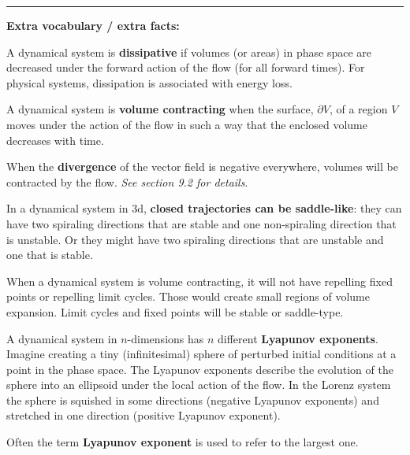 \documentclass[12pt,letterpaper,noanswers]{exam}
\begin{document}
\vspace{0.2cm}
\hrule
\vspace{0.2cm}

\noindent \textbf{Extra vocabulary / extra facts:}
\begin{tcolorbox}

A dynamical system is \textbf{dissipative} if volumes (or areas) in phase space are decreased under the forward action of the flow (for all forward times).  For physical systems, dissipation is associated with energy loss.

A dynamical system is \textbf{volume contracting} when the surface, $\partial V$, of a region $V$ moves under the action of the flow in such a way that the enclosed volume decreases with time. %

When the \textbf{divergence} of the vector field is negative everywhere, volumes will be contracted by the flow.  \emph{See section 9.2 for details}.

In a dynamical system in 3d, \textbf{closed trajectories can be saddle-like}: they can have two spiraling directions that are stable and one non-spiraling direction that is unstable.  Or they might have two spiraling directions that are unstable and one that is stable.
\end{tcolorbox}

\begin{tcolorbox}
When a dynamical system is volume contracting, it will not have repelling fixed points or repelling limit cycles.  Those would create small regions of volume expansion.  Limit cycles and fixed points will be stable or saddle-type.

A dynamical system in $n$-dimensions has $n$ different \textbf{Lyapunov exponents}. Imagine creating a tiny (infinitesimal) sphere of perturbed initial conditions at a point in the phase space.  The Lyapunov exponents describe the evolution of the sphere into an ellipsoid under the local action of the flow.  In the Lorenz system the sphere is squished in some directions (negative Lyapunov exponents) and stretched in one direction (positive Lyapunov exponent).

Often the term \textbf{Lyapunov exponent} is used to refer to the largest one.

\end{tcolorbox}
\end{document}
